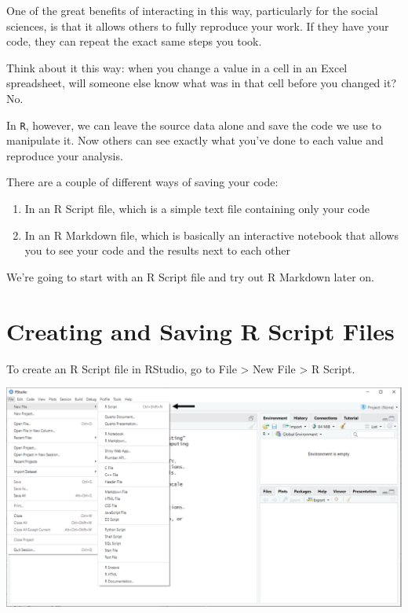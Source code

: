 \documentclass[
]{book}
\begin{document}
One of the great benefits of interacting in this way, particularly for the social sciences, is that it allows others to fully reproduce your work. If they have your code, they can repeat the exact same steps you took.

Think about it this way: when you change a value in a cell in an Excel spreadsheet, will someone else know what was in that cell before you changed it? No.

In \texttt{R}, however, we can leave the source data alone and save the code we use to manipulate it. Now others can see exactly what you've done to each value and reproduce your analysis.

There are a couple of different ways of saving your code:

\begin{enumerate}
\def\labelenumi{\arabic{enumi}.}
\item
  In an R Script file, which is a simple text file containing only your code
\item
  In an R Markdown file, which is basically an interactive notebook that allows you to see your code and the results next to each other
\end{enumerate}

We're going to start with an R Script file and try out R Markdown later on.

\hypertarget{creating-and-saving-r-script-files}{%
\section{Creating and Saving R Script Files}\label{creating-and-saving-r-script-files}}

To create an R Script file in RStudio, go to File \textgreater{} New File \textgreater{} R Script.

\includegraphics{docs/_main_files/figure-html/RStudio_Opening an R Script File.png}
\end{document}
